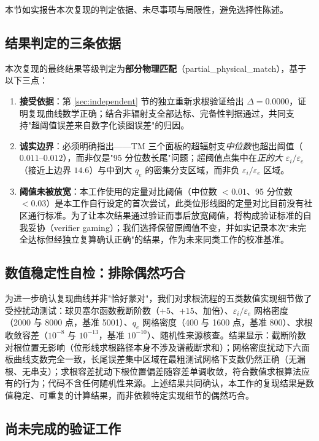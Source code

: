 \documentclass[12pt]{ctexart}
\begin{document}
本节如实报告本次复现的判定依据、未尽事项与局限性，避免选择性陈述。

\subsection{结果判定的三条依据}

本次复现的最终结果等级判定为\textbf{部分物理匹配}（partial\_physical\_match），基于以下三点：

\begin{enumerate}
  \item \textbf{接受依据}：第 \ref{sec:independent} 节的独立重新求根验证给出 $\Delta=0.0000$，证明复现曲线数学正确；结合非辐射支全部达标、完备性判据通过，共同支持"超阈值误差来自数字化读图误差"的归因。
  \item \textbf{诚实边界}：必须明确指出——TM 三个面板的超辐射支\emph{中位数}也超出阈值（$0.011$--$0.012$），而非仅是"95 分位数长尾"问题；超阈值点集中在\emph{正的大 $\varepsilon_i/\varepsilon_e$}（接近上边界 $14.6$）与中到大 $q_e$ 的密集分支区域，而非负 $\varepsilon_i/\varepsilon_e$ 区域。
  \item \textbf{阈值未被放宽}：本工作使用的定量对比阈值（中位数 $<0.01$、95 分位数 $<0.03$）是本工作自行设定的首次尝试，此类位形线图的定量对比目前没有社区通行标准。为了让本次结果通过验证而事后放宽阈值，将构成验证标准的自我妥协（verifier gaming）；我们选择保留原阈值不变，并如实记录本次"未完全达标但经独立复算确认正确"的结果，作为未来同类工作的校准基准。
\end{enumerate}

\subsection{数值稳定性自检：排除偶然巧合}

为进一步确认复现曲线并非"恰好蒙对"，我们对求根流程的五类数值实现细节做了受控扰动测试：球贝塞尔函数截断阶数（$+5$、$+15$、加倍）、$\varepsilon_i/\varepsilon_e$ 网格密度（2000 与 8000 点，基准 5001）、$q_e$ 网格密度（400 与 1600 点，基准 800）、求根收敛容差（$10^{-8}$ 与 $10^{-13}$，基准 $10^{-10}$）、随机性来源核查。结果显示：截断阶数对根位置无影响（位形线求根路径本身不涉及谱截断求和）；网格密度扰动下六面板曲线支数完全一致，长尾误差集中区域在最粗测试网格下支数仍然正确（无漏根、无串支）；求根容差扰动下根位置偏差随容差单调收敛，符合数值求根算法应有的行为；代码不含任何随机性来源。上述结果共同确认，本工作的复现结果是数值稳定、可重复的计算结果，而非依赖特定实现细节的偶然巧合。

\subsection{尚未完成的验证工作}
\end{document}
